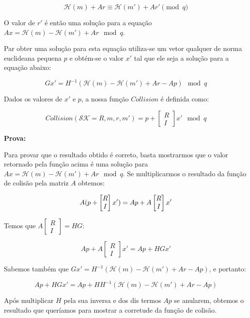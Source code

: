 \documentclass[a4paper]{article}
\begin{document}
$$
\mathcal{H}(m) + Ar  \equiv \mathcal{H}(m') + Ar' \pmod q
$$

O valor de $r'$ é então uma solução para a equação $Ax =
\mathcal{H}(m) - \mathcal{H}(m') + Ar \mod q$.

Par obter uma solução para esta equação utiliza-se um vetor qualquer
de norma euclideana pequena $p$ e obtém-se o valor $x'$ tal que ele
seja a solução para a equação abaixo:

$$
Gx' = H^{-1}(\mathcal{H}(m) - \mathcal{H}(m') + Ar - Ap) \mod q
$$

Dados os valores de $x'$ e $p$, a nossa função $Collision$ é definida
como:

$$ Collision(\mathcal{SK}=R, m, r, m') = p +
\left[\begin{matrix}R\\I\end{matrix}\right]x' \mod q
$$

\textbf{Prova:}

Para provar que o resultado obtido é correto, basta mostrarmos que o
valor retornado pela função acima é uma solução para $Ax =
\mathcal{H}(m) - \mathcal{H}(m') + Ar \mod q$. Se multiplicarmos o
resultado da função de colisão pela matriz $A$ obtemos:

$$ A(p+\left[\begin{matrix}R\\I\end{matrix}\right]x') = Ap +
A\left[\begin{matrix}R\\I\end{matrix}\right]x'\\
$$

Temos que $A\left[\begin{matrix}R\\I\end{matrix}\right] = HG$:

$$
Ap + A\left[\begin{matrix}R\\I\end{matrix}\right]x' = Ap + HGx'
$$

Sabemos também que $Gx' = H^{-1}(\mathcal{H}(m) - \mathcal{H}(m') + Ar
- Ap)$, e portanto:

$$
Ap + HGx' = Ap + H H^{-1}(\mathcal{H}(m) - \mathcal{H}(m') + Ar - Ap)
$$

Após multiplicar $H$ pela sua inversa e dos dis termos $Ap$ se
anularem, obtemos o resultado que queríamos para mostrar a corretude
da função de colisão.
\end{document}
